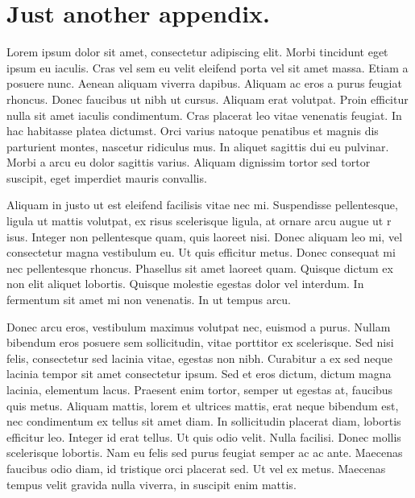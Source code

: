 \documentclass[openany]{book}
\begin{document}
\chapter{Just another appendix.}
Lorem ipsum dolor sit amet, consectetur adipiscing elit. Morbi tincidunt eget 
ipsum eu iaculis. Cras vel sem eu velit eleifend porta vel sit amet massa. Etiam 
a posuere nunc. Aenean aliquam viverra dapibus. Aliquam ac eros a purus feugiat 
rhoncus. Donec faucibus ut nibh ut cursus. Aliquam erat volutpat. Proin efficitur 
nulla sit amet iaculis condimentum. Cras placerat leo vitae venenatis feugiat. In 
hac habitasse platea dictumst. Orci varius natoque penatibus et magnis dis 
parturient montes, nascetur ridiculus mus. In aliquet sagittis dui eu pulvinar. 
Morbi a arcu eu dolor sagittis varius. Aliquam dignissim tortor sed tortor 
suscipit, eget imperdiet mauris convallis.

Aliquam in justo ut est eleifend facilisis vitae nec mi. Suspendisse pellentesque, 
ligula ut mattis volutpat, ex risus scelerisque ligula, at ornare arcu augue ut r
isus. Integer non pellentesque quam, quis laoreet nisi. Donec aliquam leo mi, vel 
consectetur magna vestibulum eu. Ut quis efficitur metus. Donec consequat mi nec 
pellentesque rhoncus. Phasellus sit amet laoreet quam. Quisque dictum ex non elit 
aliquet lobortis. Quisque molestie egestas dolor vel interdum. In fermentum sit 
amet mi non venenatis. In ut tempus arcu.

Donec arcu eros, vestibulum maximus volutpat nec, euismod a purus. Nullam bibendum 
eros posuere sem sollicitudin, vitae porttitor ex scelerisque. Sed nisi felis, 
consectetur sed lacinia vitae, egestas non nibh. Curabitur a ex sed neque lacinia 
tempor sit amet consectetur ipsum. Sed et eros dictum, dictum magna lacinia, 
elementum lacus. Praesent enim tortor, semper ut egestas at, faucibus quis metus. 
Aliquam mattis, lorem et ultrices mattis, erat neque bibendum est, nec condimentum 
ex tellus sit amet diam. In sollicitudin placerat diam, lobortis efficitur leo. 
Integer id erat tellus. Ut quis odio velit. Nulla facilisi. Donec mollis 
scelerisque lobortis. Nam eu felis sed purus feugiat semper ac ac ante. Maecenas 
faucibus odio diam, id tristique orci placerat sed. Ut vel ex metus. Maecenas 
tempus velit gravida nulla viverra, in suscipit enim mattis.



\backmatter
\printindex
{}

\end{document}
